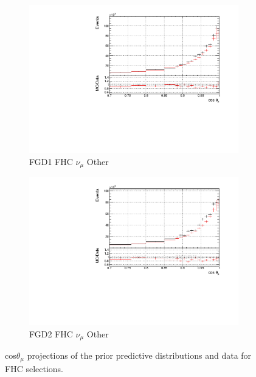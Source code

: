 \begin{figure}[!h]
\begin{subfigure}{0.49\textwidth}
  \centering
  \includegraphics[width=\textwidth]{figs/prioronly1D_t_FGD1_numuCC_other}
  \caption{FGD1 FHC $\nu_{\mu}$ Other}
\end{subfigure}
\begin{subfigure}{0.49\textwidth}
  \centering
  \includegraphics[width=\textwidth]{figs/prioronly1D_t_FGD2_numuCC_other}
  \caption{FGD2 FHC $\nu_{\mu}$ Other}
\end{subfigure}
\caption{cos$\theta_{\mu}$ projections of the prior predictive distributions and data for FHC \numu selections.}
\label{fig:priorpost_fhc_t}
\end{figure}

